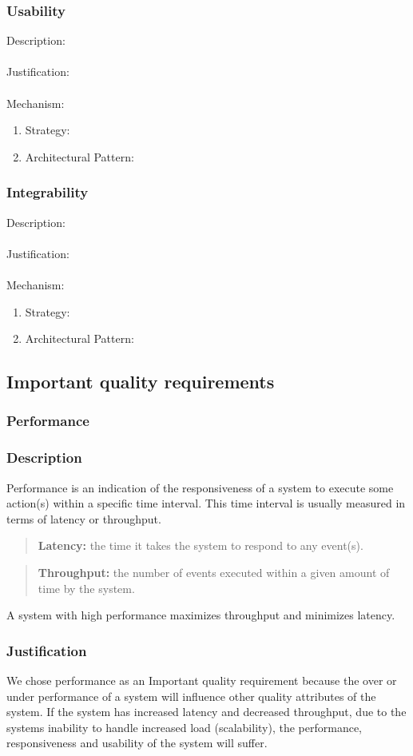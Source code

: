 \documentclass[a4paper,12pt,titlepage]{article}
\begin{document}
\subsubsection{Usability}%
	Description: \\\\
	Justification: \\\\
	Mechanism:
	\begin{enumerate}
		\item Strategy: 
		\item Architectural Pattern:
	\end{enumerate}
\subsubsection{Integrability}%
	Description: \\\\
	Justification: \\\\
	Mechanism:
	\begin{enumerate}
		\item Strategy: 
		\item Architectural Pattern:
	\end{enumerate}
\newpage
\subsection{Important quality requirements}
\subsubsection{Performance}%
	\subsubsection*{Description}
	Performance is an indication of the responsiveness of a system to execute some action(s) within a specific time interval. This time interval is usually measured in terms of latency or throughput. 
	\begin{quote}
		\textbf{Latency:} the time it takes the system to respond to any event(s).
	\end{quote} 
	\begin{quote}
		\textbf{Throughput:} the number of events executed within a given amount of time by the system.
	\end{quote} 
	A system with high performance maximizes throughput and minimizes latency.
	\subsubsection*{Justification}
	We chose performance as an Important quality requirement because the over or under performance of a system will influence other quality attributes of the system. If the system has increased latency and decreased throughput, due to the systems inability to handle increased load (scalability), the performance, responsiveness and usability of the system will suffer. 
\end{document}
